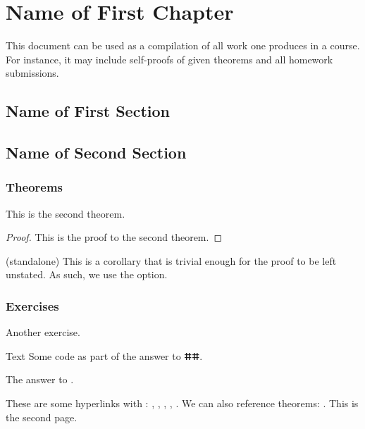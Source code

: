 \documentclass[11pt, a4paper]{book}
\begin{document}
\frontmatter
%

%
\tableofcontents
\thispagestyle{empty}
\newpage
\setcounter{page}{1}
%
\mainmatter
\chapter{Name of First Chapter}
This document can be used as a compilation of all work one produces in a course. For instance, it may include self-proofs of given theorems and all homework submissions.
%
\section{Name of First Section}
%
\section{Name of Second Section}
\subsection{Theorems}
\begin{theorem}
    This is the second theorem.
\end{theorem}
\begin{proof}
    This is the proof to the second theorem.
\end{proof}
\begin{corollary}(standalone)
    This is a corollary that is trivial enough for the proof to be left unstated. As such, we use the  option.
\end{corollary}
\subsection{Exercises}
\begin{exercise}\label{ex:1.2}
    Another exercise.
\end{exercise}
\begin{code}{Text}
    Some code as part of the answer to ⵌⵌ.
\end{code}
\begin{answer}
    The answer to .
\end{answer}
These are some hyperlinks with : , , , , . We can also reference theorems: . 
\newpage
This is the second page.
\end{document}
